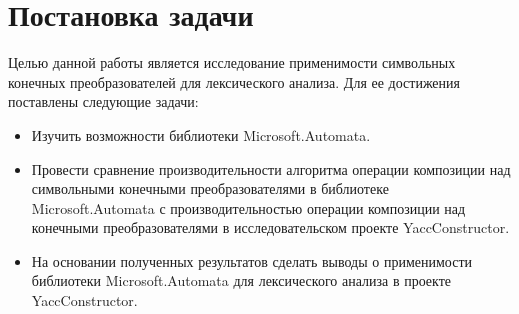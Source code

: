 \section{Постановка задачи}
Целью данной работы является исследование применимости символьных конечных преобразователей для лексического анализа. Для ее достижения поставлены следующие задачи:

\begin{itemize}
    \item Изучить возможности библиотеки Microsoft.Automata.
\item Провести сравнение производительности алгоритма операции композиции над символьными конечными преобразователями в библиотеке Microsoft.Automata с производительностью операции композиции над конечными преобразователями в исследовательском проекте YaccConstructor.
\item На основании полученных результатов сделать выводы о применимости библиотеки Microsoft.Automata для лексического анализа в проекте YaccConstructor.
  \end{itemize}
